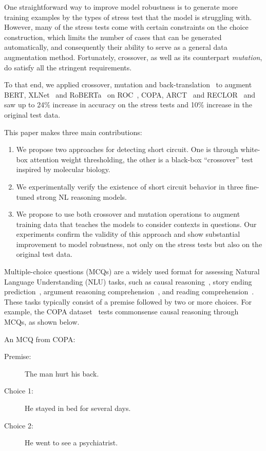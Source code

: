 One straightforward way to improve model robustness is to generate more 
training examples by the types of stress test that the model is struggling with. 
However, many of the stress tests come with certain constraints on the choice
construction, which limits the number of cases that can be generated
automatically, and consequently their ability to serve as a general 
data augmentation method. 
Fortunately, crossover, as well as its counterpart \textit{mutation}, 
do satisfy all the stringent requirements. 

To that end, we applied crossover, mutation and back-translation~\cite{back2019} to augment
BERT, XLNet~\cite{xlnet2019nips} and RoBERTa~\cite{roberta2019} on ROC~\cite{roc2017}, COPA, ARCT~\cite{arct2018} and RECLOR~\cite{yu2020reclor} and saw
up to 24\% increase in accuracy on the stress tests and 10\% increase in
the original test data.

This paper makes three main contributions:
\begin{enumerate}
\item We propose two approaches for detecting short circuit. One is through white-box attention weight thresholding, the other is a black-box ``crossover'' test inspired by molecular biology.
\item We experimentally verify the existence of short circuit behavior
in three fine-tuned strong NL reasoning models. 
\item We propose to use both crossover and mutation operations
to augment training data that teaches the models to consider 
contexts in questions. Our experiments confirm the validity 
of this approach and show substantial improvement to model robustness,
not only on the stress tests but also on the original test data.
\end{enumerate}

\fi
Multiple-choice questions (MCQs) are a widely used format for assessing Natural Language Understanding (NLU) tasks, such as causal reasoning~\cite{copa2012}, story ending prediction~\cite{roc2017}, argument reasoning comprehension~\cite{arct2018}, and reading comprehension~\cite{yu2020reclor}. These tasks typically consist of a premise followed by two or more choices. For example, the COPA dataset~\cite{copa2012} tests commonsense causal reasoning through MCQs, as shown below.

\begin{example}\label{ex:copa}
An MCQ from COPA:
\begin{description}
\item[Premise:] The man hurt his back.
\item[Choice 1:] He stayed in bed for several days. \Checkmark
\item[Choice 2:] He went to see a psychiatrist. \XSolidBrush
\end{description}
\end{example}

